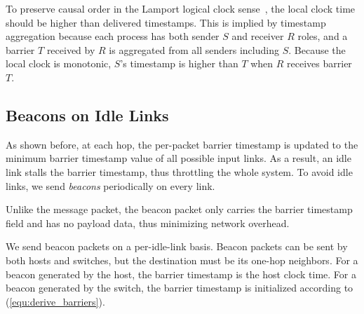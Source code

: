 

To preserve causal order in the Lamport logical clock sense~\cite{lamport1978time}, the local clock time should be higher than delivered timestamps.
This is implied by timestamp aggregation because each process has both sender $S$ and receiver $R$ roles, and a barrier $T$ received by $R$ is aggregated from all senders including $S$.
Because the local clock is monotonic, $S$'s timestamp is higher than $T$ when $R$ receives barrier $T$.



\subsection{Beacons on Idle Links}
\label{sec:beacon}

As shown before, at each hop, the per-packet barrier timestamp is updated to the minimum barrier timestamp value of all possible input links.
As a result, an idle link stalls the barrier timestamp, thus throttling the whole system.
To avoid idle links, we send \textit{beacons} periodically on every link.



Unlike the message packet, the beacon packet only carries the barrier timestamp field and has no payload data, thus minimizing network overhead. 

We send beacon packets on a per-idle-link basis.
Beacon packets can be sent by both hosts and switches,
but the destination must be its one-hop neighbors. For a beacon generated by the host, the barrier timestamp is the host clock time. For a beacon generated by the switch, the barrier timestamp is initialized according to (\ref{equ:derive_barriers}).

